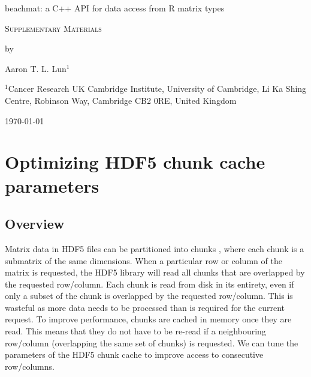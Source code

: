 \documentclass{article}
\begin{document}
\begin{titlepage}
\vspace*{3cm}
\begin{center}


{\LARGE
beachmat: a C++ API for data access from R matrix types
\par}

\vspace{0.75cm}

{\Large
    \textsc{Supplementary Materials}
\par
}
\vspace{0.75cm}

\large
by


\vspace{0.75cm}
Aaron T. L. Lun$^1$

\vspace{1cm}
\begin{minipage}{0.9\textwidth}
\begin{flushleft}
$^1$Cancer Research UK Cambridge Institute, University of Cambridge, Li Ka Shing Centre, Robinson Way, Cambridge CB2 0RE, United Kingdom \\[6pt]
\end{flushleft}
\end{minipage}

\vspace{1.5cm}
{\large \today{}}

\vspace*{\fill}
\end{center}
\end{titlepage}

\providecommand{\myceil}[1]{\left \lceil #1 \right \rceil }

\section{Optimizing HDF5 chunk cache parameters}

\subsection{Overview}
Matrix data in HDF5 files can be partitioned into chunks \cite{hdf5chunk}, where each chunk is a submatrix of the same dimensions.
When a particular row or column of the matrix is requested, the HDF5 library will read all chunks that are overlapped by the requested row/column.
Each chunk is read from disk in its entirety, even if only a subset of the chunk is overlapped by the requested row/column.
This is wasteful as more data needs to be processed than is required for the current request.
To improve performance, chunks are cached in memory once they are read.
This means that they do not have to be re-read if a neighbouring row/column (overlapping the same set of chunks) is requested.
We can tune the parameters of the HDF5 chunk cache to improve access to consecutive row/columns.
\end{document}
